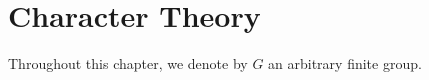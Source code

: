 \chapter{Character Theory}
\thispagestyle{empty}

Throughout this chapter, we denote by $G$ an arbitrary finite group.



